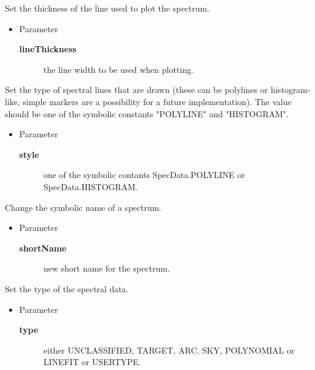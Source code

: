 \begin{desc}Set the thickness of the line used to plot the spectrum.
\begin{itemize}
\item{Parameter
  \begin{description}
   \item[\textbf{lineThickness}]{the line width to be used when plotting.}
  \end{description}}
\end{itemize}
\end{desc}

\begin{desc}Set the type of spectral lines that are drawn (these can be
 polylines or histogram-like, simple markers are a possibility
 for a future implementation). The value should be one of the
 symbolic constants "POLYLINE" and "HISTOGRAM".
\begin{itemize}
\item{Parameter
  \begin{description}
   \item[\textbf{style}]{one of the symbolic contants SpecData.POLYLINE or
             SpecData.HISTOGRAM.}
  \end{description}}
\end{itemize}
\end{desc}

\begin{desc}Change the symbolic name of a spectrum.
\begin{itemize}
\item{Parameter
  \begin{description}
   \item[\textbf{shortName}]{new short name for the spectrum.}
  \end{description}}
\end{itemize}
\end{desc}

\begin{desc}Set the type of the spectral data.
\begin{itemize}
\item{Parameter
  \begin{description}
   \item[\textbf{type}]{either UNCLASSIFIED, TARGET, ARC, SKY, POLYNOMIAL or
                    LINEFIT or USERTYPE.}
  \end{description}}
\end{itemize}
\end{desc}

